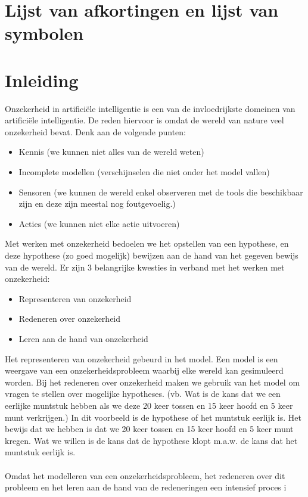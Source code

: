 \documentclass[12pt,a4paper,oneside]{book}
\begin{document}
\chapter{Lijst van afkortingen en lijst van symbolen}
\tableofcontents


\newpage
\mainmatter
\setcounter{page}{0}
\chapter{Inleiding}
Onzekerheid in artifici\"{e}le intelligentie is een van de invloedrijkste domeinen van artifici\"{e}le intelligentie. De reden hiervoor is omdat de wereld van nature veel onzekerheid bevat. Denk aan de volgende punten:
\begin{itemize}
  \item Kennis (we kunnen niet alles van de wereld weten)
  \item Incomplete modellen (verschijnselen die niet onder het model vallen)
  \item Sensoren (we kunnen de wereld enkel observeren met de tools die beschikbaar zijn en deze zijn meestal nog foutgevoelig.)
  \item Acties (we kunnen niet elke actie uitvoeren)
\end{itemize}
Met werken met onzekerheid bedoelen we het opstellen van een hypothese, en deze hypothese (zo goed mogelijk) bewijzen aan de hand van het gegeven bewijs van de wereld.
Er zijn 3 belangrijke kwesties in verband met het werken met onzekerheid:
\begin{itemize}
  \item Representeren van onzekerheid
  \item Redeneren over onzekerheid
  \item Leren aan de hand van onzekerheid
\end{itemize}
Het representeren van onzekerheid gebeurd in het model. Een model is een weergave van een onzekerheidsprobleem waarbij elke wereld kan gesimuleerd worden.
Bij het redeneren over onzekerheid maken we gebruik van het model om vragen te stellen over mogelijke hypotheses. 
(vb. Wat is de kans dat we een eerlijke muntstuk hebben als we deze 20 keer tossen en 15 keer hoofd en 5 keer munt verkrijgen.)
In dit voorbeeld is de hypothese of het muntstuk eerlijk is. Het bewijs dat we hebben is dat we 20 keer tossen en 15 keer hoofd en 5 keer munt kregen. Wat we willen is de kans dat de hypothese klopt m.a.w. de kans dat het muntstuk eerlijk is.
\\\\
Omdat het modelleren van een onzekerheidsprobleem, het redeneren over dit probleem en het leren aan de hand van de redeneringen een intensief proces i
\end{document}
